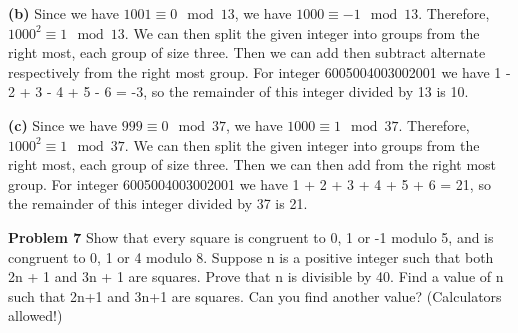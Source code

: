\documentclass[12pt,letterpaper]{hmcpset}
\begin{document}
\begin{solution}\textbf{(b)} Since we have $1001 \equiv 0 \mod 13$, we have $1000 \equiv -1 \mod 13$. Therefore, $1000^{2} \equiv 1 \mod 13$. We can then split the given integer into groups from the right most, each group of size three. Then we can add then subtract alternate respectively from the right most group. For integer 6005004003002001 we have 1 - 2 + 3 - 4 + 5 - 6 = -3, so the remainder of this integer divided by 13 is 10.
\end{solution}

\begin{solution}\textbf{(c)} Since we have $999 \equiv 0 \mod 37$, we have $1000 \equiv 1 \mod 37$. Therefore, $1000^{2} \equiv 1 \mod 37$. We can then split the given integer into groups from the right most, each group of size three. Then we can then add from the right most group. For integer 6005004003002001 we have 1 + 2 + 3 + 4 + 5 + 6 = 21, so the remainder of this integer divided by 37 is 21.
\end{solution}
\begin{problem}\textbf{Problem 7} Show that every square is congruent to 0, 1 or -1 modulo 5, and is congruent to 0, 1 or 4 modulo 8.
Suppose n is a positive integer such that both 2n + 1 and 3n + 1 are squares. Prove that n is divisible by 40.
Find a value of n such that 2n+1 and 3n+1 are squares. Can you find another value? (Calculators allowed!)
\end{problem}
\end{document}
